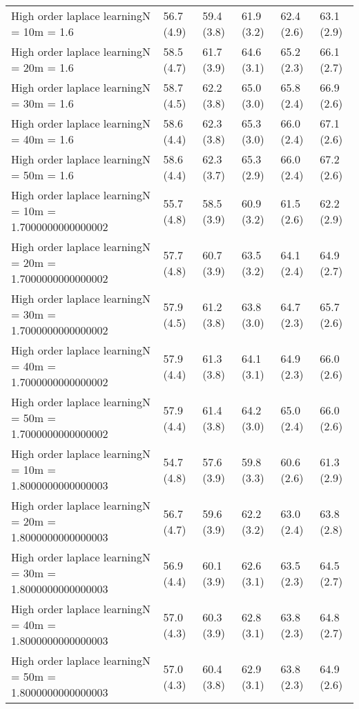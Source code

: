 \documentclass{article}
\begin{document}
\begin{table*}[t!]
\begin{center}
\begin{small}
\begin{sc}
\begin{tabular}{llllll}
High order laplace learningN = 10m = 1.6&56.7 (4.9)      &59.4 (3.8)      &61.9 (3.2)      &62.4 (2.6)      &63.1 (2.9)      \\
High order laplace learningN = 20m = 1.6&58.5 (4.7)      &61.7 (3.9)      &64.6 (3.1)      &65.2 (2.3)      &66.1 (2.7)      \\
High order laplace learningN = 30m = 1.6&58.7 (4.5)      &62.2 (3.8)      &65.0 (3.0)      &65.8 (2.4)      &66.9 (2.6)      \\
High order laplace learningN = 40m = 1.6&58.6 (4.4)      &62.3 (3.8)      &65.3 (3.0)      &66.0 (2.4)      &67.1 (2.6)      \\
High order laplace learningN = 50m = 1.6&58.6 (4.4)      &62.3 (3.7)      &65.3 (2.9)      &66.0 (2.4)      &67.2 (2.6)      \\
High order laplace learningN = 10m = 1.7000000000000002&55.7 (4.8)      &58.5 (3.9)      &60.9 (3.2)      &61.5 (2.6)      &62.2 (2.9)      \\
High order laplace learningN = 20m = 1.7000000000000002&57.7 (4.8)      &60.7 (3.9)      &63.5 (3.2)      &64.1 (2.4)      &64.9 (2.7)      \\
High order laplace learningN = 30m = 1.7000000000000002&57.9 (4.5)      &61.2 (3.8)      &63.8 (3.0)      &64.7 (2.3)      &65.7 (2.6)      \\
High order laplace learningN = 40m = 1.7000000000000002&57.9 (4.4)      &61.3 (3.8)      &64.1 (3.1)      &64.9 (2.3)      &66.0 (2.6)      \\
High order laplace learningN = 50m = 1.7000000000000002&57.9 (4.4)      &61.4 (3.8)      &64.2 (3.0)      &65.0 (2.4)      &66.0 (2.6)      \\
High order laplace learningN = 10m = 1.8000000000000003&54.7 (4.8)      &57.6 (3.9)      &59.8 (3.3)      &60.6 (2.6)      &61.3 (2.9)      \\
High order laplace learningN = 20m = 1.8000000000000003&56.7 (4.7)      &59.6 (3.9)      &62.2 (3.2)      &63.0 (2.4)      &63.8 (2.8)      \\
High order laplace learningN = 30m = 1.8000000000000003&56.9 (4.4)      &60.1 (3.9)      &62.6 (3.1)      &63.5 (2.3)      &64.5 (2.7)      \\
High order laplace learningN = 40m = 1.8000000000000003&57.0 (4.3)      &60.3 (3.9)      &62.8 (3.1)      &63.8 (2.3)      &64.8 (2.7)      \\
High order laplace learningN = 50m = 1.8000000000000003&57.0 (4.3)      &60.4 (3.8)      &62.9 (3.1)      &63.8 (2.3)      &64.9 (2.6)      \\

\end{tabular}
\end{sc}
\end{small}
\end{center}
\end{table*}
\end{document}
